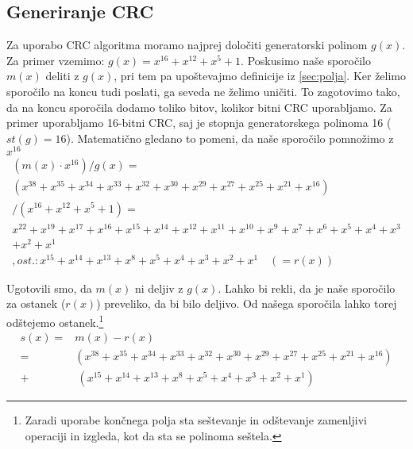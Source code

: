 \documentclass[12pt]{article}
\begin{document}
        \subsection{Generiranje CRC}
        Za uporabo CRC algoritma moramo najprej določiti generatorski polinom
        $g(x)$. Za primer vzemimo: $g(x)=x^{16}+x^{12}+x^5+1$. Poskusimo naše
        sporočilo $m(x)$ deliti z $g(x)$, pri tem pa upoštevajmo definicije iz
        \ref{sec:polja}. Ker želimo sporočilo na koncu tudi poslati, ga seveda
        ne želimo uničiti. To zagotovimo tako, da na koncu sporočila dodamo
        toliko bitov, kolikor bitni CRC uporabljamo. Za primer uporabljamo
        16-bitni CRC, saj je stopnja generatorskega polinoma 16 ($st(g)=16$).
        Matematično gledano to pomeni, da naše sporočilo pomnožimo z $x^{16}$
        \begin{equation}
            \begin{split}
                (m(x) \cdot x^{16})/g(x) =\\
                (x^{38} + x^{35} + x^{34} + x^{33} + x^{32} +
                x^{30} + x^{29} + x^{27} + x^{25} + x^{21} + x^{16})\\
                /(x^{16} +x^{12} + x^5 + 1)=\\
                x^{22} + x^{19} + x^{17} + x^{16} + x^{15} +
                x^{14} + x^{12} + x^{11} + x^{10} + x^{9} + x^{7} +
                x^{6} + x^{5} + x^{4} + x^{3}\\ + x^{2} + x^{1}\\
                , ost.: x^{15} + x^{14} + x^{13} + x^8 + x^5 + x^4 + x^3 +
                x^2 + x^1 \quad (=r(x))
            \end{split}
        \end{equation}

        Ugotovili smo, da $m(x)$ ni deljiv z $g(x)$. Lahko bi rekli, da je naše
        sporočilo za ostanek ($r(x)$) preveliko, da bi bilo deljivo. Od našega
        sporočila lahko torej odštejemo ostanek.\footnote{Zaradi uporabe končnega
        polja sta seštevanje in odštevanje zamenljivi operaciji in izgleda, kot
        da sta se polinoma seštela.}
        \begin{equation}
            \begin{split}
                s(x) = & m(x) - r(x)\\
                = & (x^{38} + x^{35} + x^{34} + x^{33} + x^{32} +
                x^{30} + x^{29} + x^{27} + x^{25} + x^{21} + x^{16})\\
                + & \: (x^{15} + x^{14} + x^{13} + x^8 + x^5 + x^4 + x^3 +
                x^2 + x^1)
            \end{split}
        \end{equation}
\end{document}
